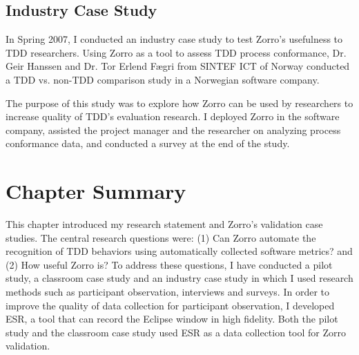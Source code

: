 
\subsection{Industry Case Study}
In Spring 2007, I conducted an industry case study to test Zorro's usefulness to TDD researchers. Using Zorro as a tool to assess TDD process conformance, Dr. Geir Hanssen and Dr. Tor Erlend F{\ae}gri from SINTEF ICT of Norway conducted a TDD vs. non-TDD comparison study in a Norwegian software company.

The purpose of this study was to explore how Zorro can be used by researchers to increase quality of TDD's evaluation research. I deployed Zorro in the software company, assisted the project manager and the researcher on analyzing process conformance data, and conducted a survey at the end of the study. 


\section{Chapter Summary}
This chapter introduced my research statement and Zorro's validation case studies. The central research questions were: (1) Can Zorro automate the recognition of TDD behaviors using automatically collected software metrics? and (2) How useful Zorro is?  To address these questions, I have conducted a pilot study, a classroom case study and an industry case study in which I used research methods such as participant observation, interviews and surveys. In order to improve the quality of data collection for participant observation, I developed ESR, a tool that can record the Eclipse window in high fidelity. Both the pilot study and the classroom case study used ESR as a data collection tool for Zorro validation. 

